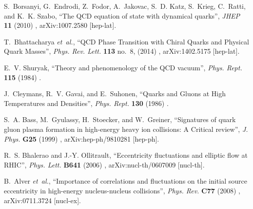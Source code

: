 \documentclass[ALICE,manyauthors]{cernphprep}
\begin{document}
\providecommand{\href}[2]{#2}\begingroup\raggedright\begin{thebibliography}{10}

S.~Borsanyi, G.~Endrodi, Z.~Fodor, A.~Jakovac, S.~D. Katz, S.~Krieg, C.~Ratti,
  and K.~K. Szabo, ``{The QCD equation of state with dynamical quarks}'',
  \href{http://dx.doi.org/10.1007/JHEP11(2010)077}{{\em JHEP} {\bfseries 11}
  (2010) },
\href{http://arxiv.org/abs/1007.2580}{{\ttfamily arXiv:1007.2580 [hep-lat]}}.

T.~Bhattacharya {\em et~al.}, ``{QCD Phase Transition with Chiral Quarks and
  Physical Quark Masses}'',
  \href{http://dx.doi.org/10.1103/PhysRevLett.113.082001}{{\em Phys. Rev.
  Lett.} {\bfseries 113} no.~8, (2014) },
\href{http://arxiv.org/abs/1402.5175}{{\ttfamily arXiv:1402.5175 [hep-lat]}}.

E.~V. Shuryak, ``{Theory and phenomenology of the QCD vacuum}'',
\href{http://dx.doi.org/10.1016/0370-1573(84)90037-1}{{\em Phys. Rept.}
  {\bfseries 115} (1984) }.

J.~Cleymans, R.~V. Gavai, and E.~Suhonen, ``{Quarks and Gluons at High
  Temperatures and Densities}'',
\href{http://dx.doi.org/10.1016/0370-1573(86)90169-9}{{\em Phys. Rept.}
  {\bfseries 130} (1986) }.

S.~A. Bass, M.~Gyulassy, H.~Stoecker, and W.~Greiner, ``{Signatures of quark
  gluon plasma formation in high-energy heavy ion collisions: A Critical
  review}'', \href{http://dx.doi.org/10.1088/0954-3899/25/3/013}{{\em J. Phys.}
  {\bfseries G25} (1999) },
\href{http://arxiv.org/abs/hep-ph/9810281}{{\ttfamily arXiv:hep-ph/9810281
  [hep-ph]}}.

R.~S. Bhalerao and J.-Y. Ollitrault, ``{Eccentricity fluctuations and elliptic
  flow at RHIC}'', \href{http://dx.doi.org/10.1016/j.physletb.2006.08.055}{{\em
  Phys. Lett.} {\bfseries B641} (2006) },
\href{http://arxiv.org/abs/nucl-th/0607009}{{\ttfamily arXiv:nucl-th/0607009
  [nucl-th]}}.

B.~Alver {\em et~al.}, ``{Importance of correlations and fluctuations on the
  initial source eccentricity in high-energy nucleus-nucleus collisions}'',
  \href{http://dx.doi.org/10.1103/PhysRevC.77.014906}{{\em Phys. Rev.}
  {\bfseries C77} (2008) },
\href{http://arxiv.org/abs/0711.3724}{{\ttfamily arXiv:0711.3724 [nucl-ex]}}.


\end{thebibliography}
\end{document}
